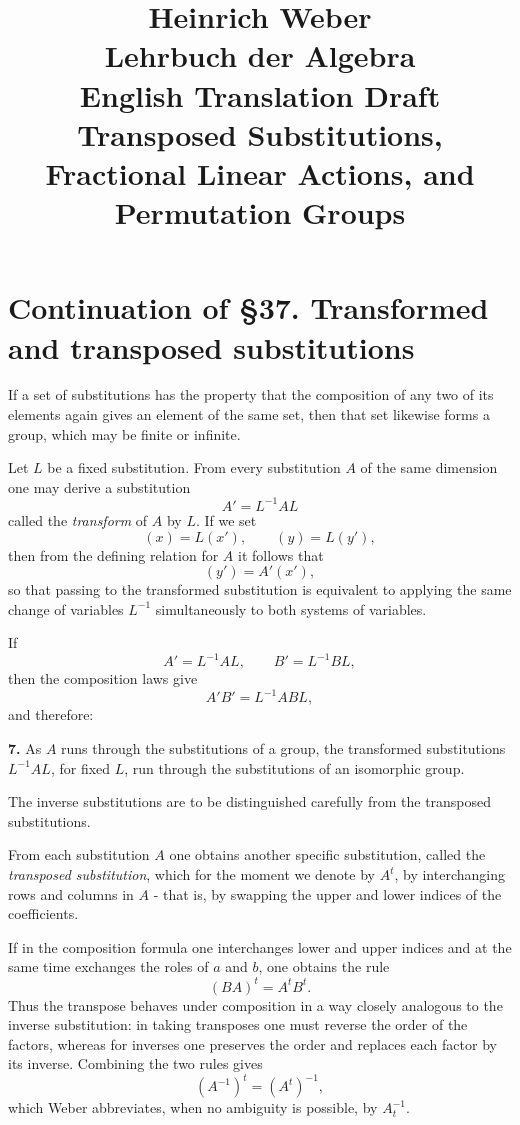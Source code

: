 \documentclass[11pt]{article}
\title{Heinrich Weber\\Lehrbuch der Algebra\\English Translation Draft\\Transposed Substitutions, Fractional Linear Actions, and Permutation Groups}
\author{}
\date{}
\begin{document}
\maketitle

\section*{Continuation of \S 37. Transformed and transposed substitutions}

If a set of substitutions has the property that the composition of any two of its elements again gives an element of the same set, then that set likewise forms a group, which may be finite or infinite.

Let $L$ be a fixed substitution. From every substitution $A$ of the same dimension one may derive a substitution
\[
A' = L^{-1}AL
\tag{21}
\]
called the \emph{transform} of $A$ by $L$.
If we set
\[
(x)=L(x'),\qquad (y)=L(y'),
\tag{22}
\]
then from the defining relation for $A$ it follows that
\[
(y') = A'(x'),
\tag{23}
\]
so that passing to the transformed substitution is equivalent to applying the same change of variables $L^{-1}$ simultaneously to both systems of variables.

If
\[
A' = L^{-1}AL,\qquad B' = L^{-1}BL,
\]
then the composition laws give
\[
A'B' = L^{-1}ABL,
\]
and therefore:

\medskip
\noindent\textbf{7.}
As $A$ runs through the substitutions of a group, the transformed substitutions $L^{-1}AL$, for fixed $L$, run through the substitutions of an isomorphic group.

\medskip
The inverse substitutions are to be distinguished carefully from the transposed substitutions.

From each substitution $A$ one obtains another specific substitution, called the \emph{transposed substitution}, which for the moment we denote by $A^{t}$, by interchanging rows and columns in $A$ - that is, by swapping the upper and lower indices of the coefficients.

If in the composition formula one interchanges lower and upper indices and at the same time exchanges the roles of $a$ and $b$, one obtains the rule
\[
(BA)^{t} = A^{t}B^{t}.
\tag{24}
\]
Thus the transpose behaves under composition in a way closely analogous to the inverse substitution: in taking transposes one must reverse the order of the factors, whereas for inverses one preserves the order and replaces each factor by its inverse. Combining the two rules gives
\[
(A^{-1})^{t} = (A^{t})^{-1},
\tag{25}
\]
which Weber abbreviates, when no ambiguity is possible, by $A^{-1}_{t}$.
\end{document}
